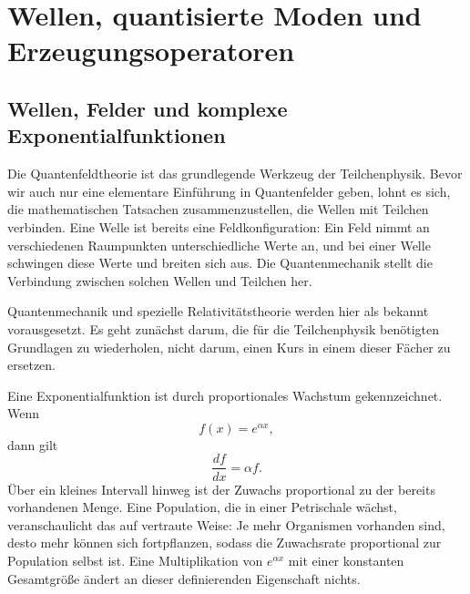 \chapter{Wellen, quantisierte Moden und Erzeugungsoperatoren}

\section{Wellen, Felder und komplexe Exponentialfunktionen}

Die Quantenfeldtheorie ist das grundlegende Werkzeug der Teilchenphysik. Bevor wir auch nur eine elementare Einführung in Quantenfelder geben, lohnt es sich, die mathematischen Tatsachen zusammenzustellen, die Wellen mit Teilchen verbinden. Eine Welle ist bereits eine Feldkonfiguration: Ein Feld nimmt an verschiedenen Raumpunkten unterschiedliche Werte an, und bei einer Welle schwingen diese Werte und breiten sich aus. Die Quantenmechanik stellt die Verbindung zwischen solchen Wellen und Teilchen her.

Quantenmechanik und spezielle Relativitätstheorie werden hier als bekannt vorausgesetzt. Es geht zunächst darum, die für die Teilchenphysik benötigten Grundlagen zu wiederholen, nicht darum, einen Kurs in einem dieser Fächer zu ersetzen.

Eine Exponentialfunktion ist durch proportionales Wachstum gekennzeichnet. Wenn
\begin{equation}
f(x)=e^{\alpha x},
\end{equation}
dann gilt
\begin{equation}
\frac{df}{dx}=\alpha f.
\end{equation}
Über ein kleines Intervall hinweg ist der Zuwachs proportional zu der bereits vorhandenen Menge. Eine Population, die in einer Petrischale wächst, veranschaulicht das auf vertraute Weise: Je mehr Organismen vorhanden sind, desto mehr können sich fortpflanzen, sodass die Zuwachsrate proportional zur Population selbst ist. Eine Multiplikation von \(e^{\alpha x}\) mit einer konstanten Gesamtgröße ändert an dieser definierenden Eigenschaft nichts.

